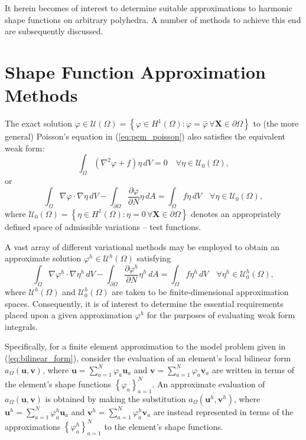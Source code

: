 	It herein becomes of interest to determine suitable approximations to harmonic shape functions on arbitrary polyhedra. A number of methods to achieve this end are subsequently discussed.
	
\section{Shape Function Approximation Methods}
	
	The exact solution $\varphi \in \mathcal{U} (\Omega) = \left\{ \varphi \in H^1(\Omega) : \varphi = \bar{\varphi} \, \forall \mathbf{X} \in \partial \Omega \right\}$ to (the more general) Poisson's equation in (\ref{eq:pem_poisson}) also satisfies the equivalent weak form:
	\begin{equation}
		\int_\Omega (\nabla^2 \varphi + f) \eta \, dV = 0 \quad \forall \eta \in \mathcal{U}_0 (\Omega),
	\end{equation}
	or
	\begin{equation}
		\int_\Omega \nabla \varphi \cdot \nabla \eta \, dV - \int_{\partial \Omega} \frac{\partial \varphi}{\partial N} \eta \, dA = \int_\Omega f \eta \, dV \quad \forall \eta \in \mathcal{U}_0 (\Omega),
		\label{eq:weak_bvp}
	\end{equation}
	where $\mathcal{U}_0 (\Omega) = \left\{ \eta \in H^1(\Omega) : \eta = 0 \, \forall \mathbf{X} \in \partial \Omega \right\}$ denotes an appropriately defined space of admissible variations -- test functions.
	
	A vast array of different variational methods may be employed to obtain an approximate solution $\varphi^h \in \mathcal{U}^h (\Omega)$ satisfying
	\begin{equation}
		\int_\Omega \nabla \varphi^h \cdot \nabla \eta^h \, dV - \int_{\partial \Omega} \frac{\partial \varphi^h}{\partial N} \eta^h \, dA = \int_\Omega f \eta^h \, dV \quad \forall \eta^h \in \mathcal{U}^h_0 (\Omega),
		\label{eq:approximate_bvp}
	\end{equation}
	where $\mathcal{U}^h (\Omega)$ and $\mathcal{U}^h_0 (\Omega)$ are taken to be finite-dimensional approximation spaces. Consequently, it is of interest to determine the essential requirements placed upon a given approximation $\varphi^h$ for the purposes of evaluating weak form integrals.
	
	Specifically, for a finite element approximation to the model problem given in (\ref{eq:bilinear_form}), consider the evaluation of an element's local bilinear form $a_{\Omega}(\mathbf{u},\mathbf{v})$, where $\mathbf{u} = \sum_{a=1}^N \varphi_a \mathbf{u}_a$ and $\mathbf{v} = \sum_{a=1}^N \varphi_a \mathbf{v}_a$ are written in terms of the element's shape functions $\left\{ \varphi_a \right\}_{a=1}^N$. An approximate evaluation of $a_{\Omega}(\mathbf{u},\mathbf{v})$ is obtained by making the substitution $a_{\Omega}(\mathbf{u}^h,\mathbf{v}^h)$, where $\mathbf{u}^h = \sum_{a=1}^N \varphi^h_a \mathbf{u}_a$ and $\mathbf{v}^h = \sum_{a=1}^N \varphi^h_a \mathbf{v}_a$ are instead represented in terms of the approximations $\left\{ \varphi^h_a \right\}_{a=1}^N$ to the element's shape functions.
	
